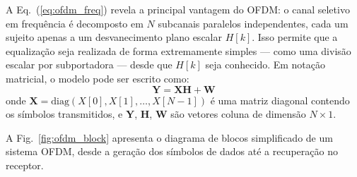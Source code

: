 \documentclass[conference]{IEEEtran}
\begin{document}
A Eq.~(\ref{eq:ofdm_freq}) revela a principal vantagem do OFDM: o canal seletivo em frequência é decomposto em $N$ subcanais paralelos independentes, cada um sujeito apenas a um desvanecimento plano escalar $H[k]$. Isso permite que a equalização seja realizada de forma extremamente simples --- como uma divisão escalar por subportadora --- desde que $H[k]$ seja conhecido. Em notação matricial, o modelo pode ser escrito como:
\begin{equation}
    \mathbf{Y} = \mathbf{X} \mathbf{H} + \mathbf{W}
    \label{eq:ofdm_matrix}
\end{equation}
onde $\mathbf{X} = \text{diag}(X[0], X[1], \ldots, X[N-1])$ é uma matriz diagonal contendo os símbolos transmitidos, e $\mathbf{Y}$, $\mathbf{H}$, $\mathbf{W}$ são vetores coluna de dimensão $N \times 1$.

A Fig.~\ref{fig:ofdm_block} apresenta o diagrama de blocos simplificado de um sistema OFDM, desde a geração dos símbolos de dados até a recuperação no receptor.
\end{document}
